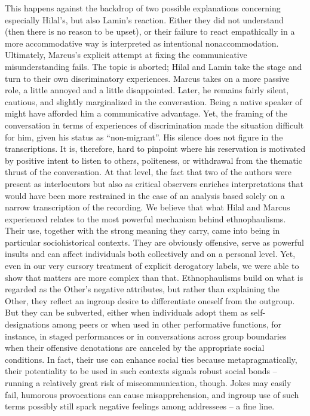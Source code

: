 \documentclass[output=paper,colorlinks,citecolor=brown]{langscibook}
\begin{document}
This happens against the backdrop of two possible explanations concerning especially Hilal's, but also Lamin's reaction. Either they did not understand (then there is no reason to be upset), or their failure to react empathically in a more accommodative way is interpreted as intentional nonaccommodation. Ultimately, Marcus's explicit attempt at fixing the communicative misunderstanding fails. The topic is aborted; Hilal and Lamin take the stage and turn to their own discriminatory experiences. Marcus takes on a more passive role, a little annoyed and a little disappointed. Later, he remains fairly silent, cautious, and slightly marginalized in the conversation. Being a native speaker of  might have afforded him a communicative advantage. Yet, the framing of the conversation in terms of experiences of discrimination made the situation difficult for him, given his status as ``non-migrant''. His silence does not figure in the transcriptions. It is, therefore, hard to pinpoint where his reservation is motivated by positive intent to listen to others, politeness, or withdrawal from the thematic thrust of the conversation. At that level, the fact that two of the authors were present as interlocutors but also as critical observers enriches interpretations that would have been more restrained in the case of an analysis based solely on a narrow transcription of the recording. We believe that what Hilal and Marcus experienced relates to the most powerful mechanism behind ethnophaulisms. Their use, together with the strong meaning they carry, came into being in particular sociohistorical contexts. They are obviously offensive, serve as powerful insults and can affect individuals both collectively and on a personal level. Yet, even in our very cursory treatment of explicit derogatory labels, we were able to show that matters are more complex than that. Ethnophaulisms build on what is regarded as the Other's negative attributes, but rather than explaining the Other, they reflect an ingroup desire to differentiate oneself from the outgroup. But they can be subverted, either when individuals adopt them as self-designations among peers or when used in other performative functions, for instance, in staged performances or in conversations across group boundaries when their offensive denotations are canceled by the appropriate social conditions. In fact, their use can enhance social ties because metapragmatically, their potentiality to be used in such contexts signals robust social bonds -- running a relatively great risk of miscommunication, though. Jokes may easily fail, humorous provocations can cause misapprehension, and ingroup use of such terms possibly still spark negative feelings among addressees -- a fine line.
\end{document}
